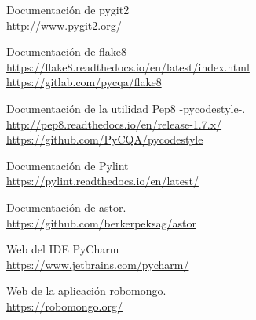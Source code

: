 \begin{thebibliography}{25}
Documentación de pygit2   \\
{\footnotesize
\url{http://www.pygit2.org/}} 

Documentación de flake8   \\
{\footnotesize
\url{https://flake8.readthedocs.io/en/latest/index.html}\\ \url{https://gitlab.com/pycqa/flake8}} 

Documentación de la utilidad Pep8 -pycodestyle-.  \\
{\footnotesize
\url{http://pep8.readthedocs.io/en/release-1.7.x/}\\
\url{https://github.com/PyCQA/pycodestyle}} 

Documentación de Pylint   \\
{\footnotesize
\url{https://pylint.readthedocs.io/en/latest/}} 

Documentación de astor.   \\
{\footnotesize
\url{https://github.com/berkerpeksag/astor}} 

Web del IDE PyCharm   \\
{\footnotesize
\url{https://www.jetbrains.com/pycharm/}} 

Web de la aplicación robomongo.   \\
{\footnotesize
\url{https://robomongo.org/}}

\end{thebibliography}
